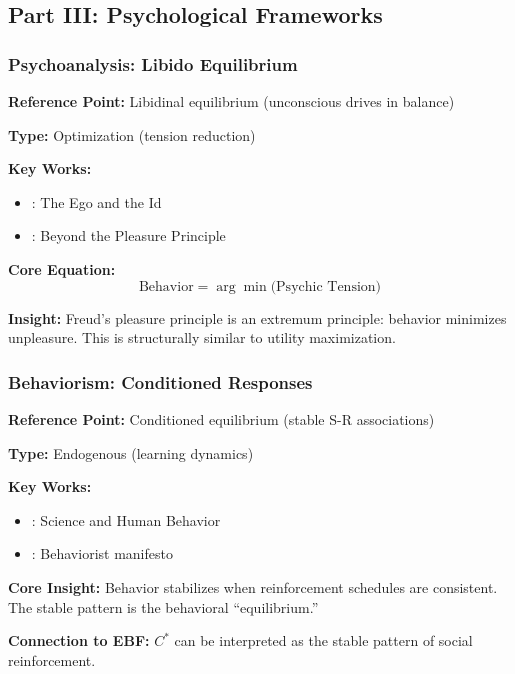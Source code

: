 
\subsection{Part III: Psychological Frameworks}
\label{sec:AY-psychology}

\subsubsection{Psychoanalysis: Libido Equilibrium}

\begin{tcolorbox}[colback=gray!5!white, colframe=gray!75!black]
\textbf{Reference Point:} Libidinal equilibrium (unconscious drives in balance)

\textbf{Type:} Optimization (tension reduction)

\textbf{Key Works:}
\begin{itemize}[nosep]
    \item \citet{freud1923}: The Ego and the Id
    \item \citet{freud1920}: Beyond the Pleasure Principle
\end{itemize}

\textbf{Core Equation:}
\begin{equation}
\text{Behavior} = \arg\min \text{(Psychic Tension)}
\end{equation}

\textbf{Insight:}
Freud's pleasure principle is an extremum principle: behavior minimizes
unpleasure. This is structurally similar to utility maximization.
\end{tcolorbox}

\subsubsection{Behaviorism: Conditioned Responses}

\begin{tcolorbox}[colback=gray!5!white, colframe=gray!75!black]
\textbf{Reference Point:} Conditioned equilibrium (stable S-R associations)

\textbf{Type:} Endogenous (learning dynamics)

\textbf{Key Works:}
\begin{itemize}[nosep]
    \item \citet{skinner1953}: Science and Human Behavior
    \item \citet{watson1913}: Behaviorist manifesto
\end{itemize}

\textbf{Core Insight:}
Behavior stabilizes when reinforcement schedules are consistent.
The stable pattern is the behavioral ``equilibrium.''

\textbf{Connection to EBF:}
$C^*$ can be interpreted as the stable pattern of social reinforcement.
\end{tcolorbox}

